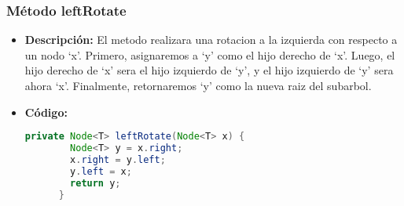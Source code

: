 \documentclass{article}
\begin{document}
  \subsubsection{Método leftRotate}
  \begin{itemize}
    \item \textbf{Descripción: }El metodo realizara una rotacion a la izquierda con respecto a un nodo ‘x’. Primero, asignaremos a ‘y’ 
    como el hijo derecho de ‘x’. Luego, el hijo derecho de ‘x’ sera el hijo izquierdo de ‘y’, y el hijo izquierdo de ‘y’ sera ahora ‘x’. 
    Finalmente, retornaremos ‘y’ como la nueva raiz del subarbol.
    \item \textbf{Código: }
    \begin{lstlisting}[language=Java, caption={Método leftRotate}]
      private Node<T> leftRotate(Node<T> x) {
        Node<T> y = x.right;
        x.right = y.left;
        y.left = x;
        return y;
      }
    \end{lstlisting}
  \end{itemize}
  
\end{document}
